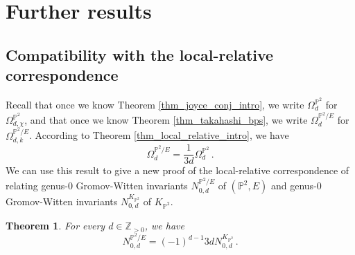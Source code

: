 \documentclass[11pt,letterpaper]{amsart}
\newtheorem{thm}[defn]{Theorem}
\newcommand\PP{\mathbb P}
\newcommand\Z{\mathbb Z}
\begin{document}
\section{Further results}
\label{section_more_gw}

\subsection{Compatibility with the local-relative correspondence}
\label{section_local_relative}
Recall that once we know Theorem 
\ref{thm_joyce_conj_intro}, we write 
$\Omega_d^{\PP^2}$ for 
$\Omega_{d,\chi}^{\PP^2}$, and that 
once we know Theorem \ref{thm_takahashi_bps}, we write 
$\Omega_d^{\PP^2/E}$ for 
$\Omega_{d,k}^{\PP^2/E}$.
According to Theorem \ref{thm_local_relative_intro}, we have
\[ \Omega_d^{\PP^2/E} = \frac{1}{3d}
\Omega_{d}^{\PP^2}\,.\]
We can use this result to give a new proof of the local-relative correspondence of \cite{MR3948687} relating 
genus-$0$ Gromov-Witten invariants 
$N_{0,d}^{\PP^2/E}$ of $(\PP^2,E)$ and 
genus-$0$ Gromov-Witten invariants 
$N_{0,d}^{K_{\PP^2}}$ of $K_{\PP^2}$.

\begin{thm}\label{thm_local_relative}
For every $d \in \Z_{>0}$, we have 
\[N_{0,d}^{\PP^2/E}=(-1)^{d-1}3d N_{0,d}^{K_{\PP^2}}\,.\]
\end{thm}
\end{document}
